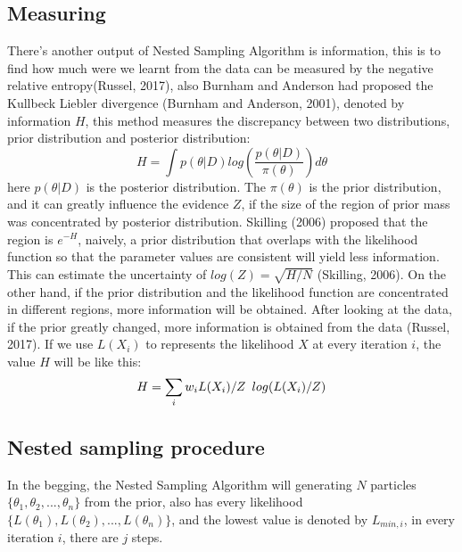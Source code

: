 \documentclass[11pt]{book}
\begin{document}
\subsection{Measuring}
There's another output of Nested Sampling Algorithm is information, this is to find how much were we learnt from the data can be 
measured by the negative relative entropy(Russel, 2017), also 
Burnham and Anderson had proposed the Kullbeck Liebler divergence (Burnham and Anderson, 2001), denoted by information $H$,
this method measures the discrepancy between two distributions, prior distribution and posterior distribution:
\begin{equation}
	H = \int p(\theta|D)log(\frac{p(\theta|D)}{\pi(\theta)})d\theta
\end{equation}
here $p(\theta|D)$ is the posterior distribution. The $\pi(\theta)$ is the prior distribution,
and it can greatly influence the evidence $Z$, if the size of the region of prior mass was concentrated by posterior distribution.
Skilling (2006) proposed that the region is $e^{-H}$, naively, 
a prior distribution that
overlaps with the likelihood function so that the parameter values are consistent will yield less information. This can estimate the uncertainty of $log(Z) = \sqrt{H/N}$ (Skilling, 2006).
On the other hand, if the prior distribution and the likelihood function are concentrated in different regions, more information will be obtained.
After looking at the data, if the prior greatly changed, more information is obtained from the data (Russel, 2017).
If we use $L(X_i)$ to represents the likelihood $X$ at every iteration $i$, 
the value $H$ will be like this:
\begin{equation}
	H = \sum _i w_iL(X_i)/Z \hspace{0.5em} log(L(X_i)/Z)
\end{equation}
\subsection{Nested sampling procedure}
In the begging, the Nested Sampling Algorithm will
generating $N$ particles $\{\theta_1, \theta_2 ,..., \theta_n\}$ from the prior, also has every likelihood 
$\{L(\theta_1), L(\theta_2) ,..., L(\theta_n)\}$, and the lowest value is denoted by $L_{min, i}$, in every iteration $i$,
there are $j$ steps.
\end{document}
